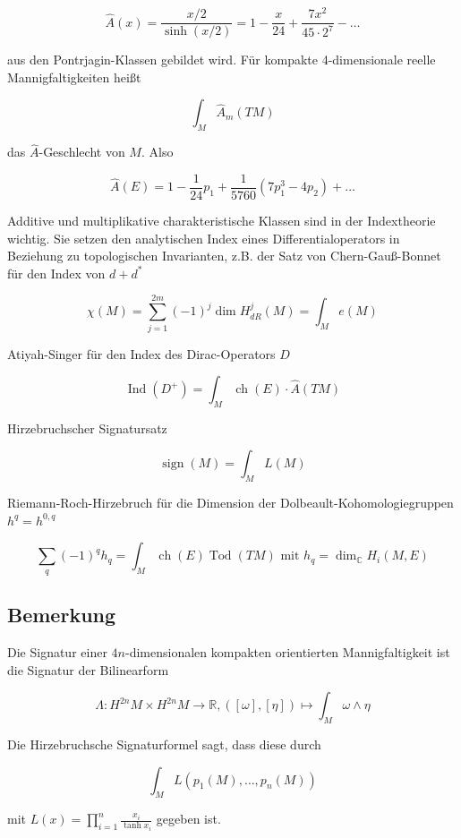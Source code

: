 \documentclass[10pt, letterpaper]{article}
\begin{document}
$$
\hat{A}(x)=\frac{x / 2}{\sinh (x / 2)}=1-\frac{x}{24}+\frac{7 x^{2}}{45 \cdot 2^{7}}-\ldots
$$

aus den Pontrjagin-Klassen gebildet wird. Für kompakte 4-dimensionale reelle Mannigfaltigkeiten heißt

$$
\int_{M} \hat{A}_{m}(T M)
$$

das $\hat{A}$-Geschlecht von $M$. Also

$$
\hat{A}(E)=1-\frac{1}{24} p_{1}+\frac{1}{5760}\left(7 p_{1}^{3}-4 p_{2}\right)+\ldots
$$

Additive und multiplikative charakteristische Klassen sind in der Indextheorie wichtig. Sie setzen den analytischen Index eines Differentialoperators in Beziehung zu topologischen Invarianten, z.B. der Satz von Chern-Gauß-Bonnet für den Index von $d+d^{*}$

$$
\chi(M)=\sum_{j=1}^{2 m}(-1)^{j} \operatorname{dim} H_{d R}^{j}(M)=\int_{M} e(M)
$$

Atiyah-Singer für den Index des Dirac-Operators $D$

$$
\operatorname{Ind}\left(D^{+}\right)=\int_{M} \operatorname{ch}(E) \cdot \hat{A}(T M)
$$

Hirzebruchscher Signatursatz

$$
\operatorname{sign}(M)=\int_{M} L(M)
$$

Riemann-Roch-Hirzebruch für die Dimension der Dolbeault-Kohomologiegruppen $h^{q}=h^{0, q}$

$$
\sum_{q}(-1)^{q} h_{q}=\int_{M} \operatorname{ch}(E) \operatorname{Tod}(T M) \text { mit } h_{q}=\operatorname{dim}_{\mathbb{C}} H_{i}(M, E)
$$

\subsection*{Bemerkung}
Die Signatur einer $4 n$-dimensionalen kompakten orientierten Mannigfaltigkeit ist die Signatur der Bilinearform

$$
\Lambda: H^{2 n} M \times H^{2 n} M \rightarrow \mathbb{R},([\omega],[\eta]) \mapsto \int_{M} \omega \wedge \eta
$$

Die Hirzebruchsche Signaturformel sagt, dass diese durch

$$
\int_{M} L\left(p_{1}(M), \ldots, p_{n}(M)\right)
$$

mit $L(x)=\prod_{i=1}^{n} \frac{x_{i}}{\tanh x_{i}}$ gegeben ist.
\end{document}
